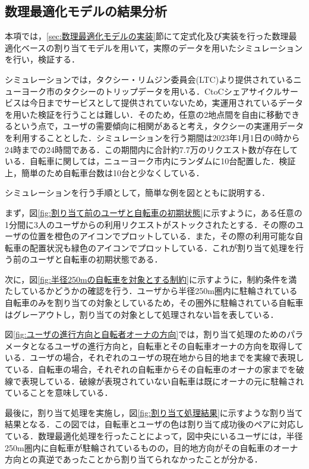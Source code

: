       \subsection{数理最適化モデルの結果分析}
        \label{sec:数理最適化モデルの結果分析}
          \par 本項では，\ref{sec:数理最適化モデルの実装}節にて定式化及び実装を行った数理最適化ベースの割り当てモデルを用いて，実際のデータを用いたシミュレーションを行い，検証する．
          \par シミュレーションでは，タクシー・リムジン委員会(LTC)より提供されているニューヨーク市のタクシーのトリップデータを用いる．CtoCシェアサイクルサービスは今日までサービスとして提供されていないため，実運用されているデータを用いた検証を行うことは難しい．そのため，任意の2地点間を自由に移動できるという点で，ユーザの需要傾向に相関があると考え，タクシーの実運用データを利用することとした．シミュレーションを行う期間は2023年1月1日の0時から24時までの24時間である．この期間内に合計約7.7万のリクエスト数が存在している．自転車に関しては，ニューヨーク市内にランダムに10台配置した．検証上，簡単のため自転車台数は10台と少なくしている．
          \par シミュレーションを行う手順として，簡単な例を図とともに説明する．
          \par まず，図\ref{fig:割り当て前のユーザと自転車の初期状態}に示すように，ある任意の1分間に3人のユーザからの利用リクエストがストックされたとする．その際のユーザの位置を橙色のアイコンでプロットしている．また，その際の利用可能な自転車の配置状況も緑色のアイコンでプロットしている．これが割り当て処理を行う前のユーザと自転車の初期状態である．
          \par 次に，図\ref{fig:半径250mの自転車を対象とする制約}に示すように，制約条件を満たしているかどうかの確認を行う．ユーザから半径250m圏内に駐輪されている自転車のみを割り当ての対象としているため，その圏外に駐輪されている自転車はグレーアウトし，割り当ての対象として処理されない旨を表している．
          \par 図\ref{fig:ユーザの進行方向と自転者オーナの方向}では，割り当て処理のためのパラメータとなるユーザの進行方向と，自転車とその自転車オーナの方向を取得している．ユーザの場合，それぞれのユーザの現在地から目的地までを実線で表現している．自転車の場合，それぞれの自転車からその自転車のオーナの家までを破線で表現している．破線が表現されていない自転車は既にオーナの元に駐輪されていることを意味している．
          \par 最後に，割り当て処理を実施し，図\ref{fig:割り当て処理結果}に示すような割り当て結果となる．この図では，自転車とユーザの色は割り当て成功後のペアに対応している．数理最適化処理を行ったことによって，図中央にいるユーザには，半径250m圏内に自転車が駐輪されているものの，目的地方向がその自転車のオーナ方向との真逆であったことから割り当てられなかったことが分かる．
